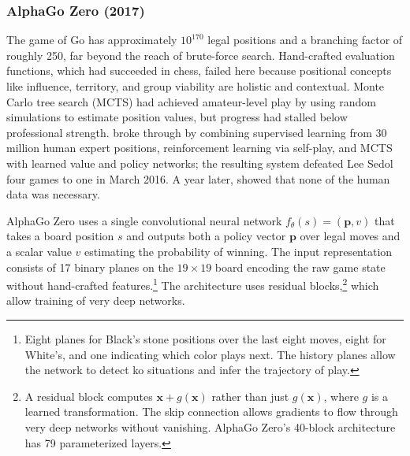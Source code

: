 \subsubsection{AlphaGo Zero (2017)}
\label{subsubsec:alphago_zero}

The game of Go has approximately $10^{170}$ legal positions and a branching factor of roughly 250, far beyond the reach of brute-force search. Hand-crafted evaluation functions, which had succeeded in chess, failed here because positional concepts like influence, territory, and group viability are holistic and contextual. Monte Carlo tree search (MCTS) had achieved amateur-level play by using random simulations to estimate position values, but progress had stalled below professional strength. \citet{Silver2016} broke through by combining supervised learning from 30 million human expert positions, reinforcement learning via self-play, and MCTS with learned value and policy networks; the resulting system defeated Lee Sedol four games to one in March 2016. A year later, \citet{Silver2017} showed that none of the human data was necessary.

AlphaGo Zero uses a single convolutional neural network $f_\theta(s) = (\mathbf{p}, v)$ that takes a board position $s$ and outputs both a policy vector $\mathbf{p}$ over legal moves and a scalar value $v$ estimating the probability of winning. The input representation consists of 17 binary planes on the $19 \times 19$ board encoding the raw game state without hand-crafted features.\footnote{Eight planes for Black's stone positions over the last eight moves, eight for White's, and one indicating which color plays next. The history planes allow the network to detect ko situations and infer the trajectory of play.} The architecture uses residual blocks,\footnote{A residual block computes $\mathbf{x} + g(\mathbf{x})$ rather than just $g(\mathbf{x})$, where $g$ is a learned transformation. The skip connection allows gradients to flow through very deep networks without vanishing. AlphaGo Zero's 40-block architecture has 79 parameterized layers.} which allow training of very deep networks.

